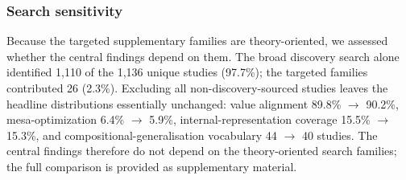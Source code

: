\subsubsection{Search sensitivity}
Because the targeted supplementary families are theory-oriented, we assessed whether the central findings depend on them. The broad discovery search alone identified 1,110 of the 1,136 unique studies (97.7\%); the targeted families contributed 26 (2.3\%). Excluding all non-discovery-sourced studies leaves the headline distributions essentially unchanged: value alignment 89.8\% $\rightarrow$ 90.2\%, mesa-optimization 6.4\% $\rightarrow$ 5.9\%, internal-representation coverage 15.5\% $\rightarrow$ 15.3\%, and compositional-generalisation vocabulary 44 $\rightarrow$ 40 studies. The central findings therefore do not depend on the theory-oriented search families; the full comparison is provided as supplementary material.

